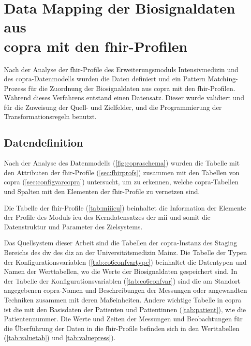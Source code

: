 \section[Data Mapping der Biosignaldaten aus \acs{copra} mit den \acs{fhir}-Profilen]{Data Mapping der Biosignaldaten aus \\ \acs{copra} mit den \acs{fhir}-Profilen} \label{sec:datamappingicucopra}

Nach der Analyse der \ac{fhir}-Profile des Erweiterungsmoduls \glqq Intensivmedizin\grqq{} und des \ac{copra}-Datenmodells wurden die Daten definiert und ein Pattern Matching-Prozess für die Zuordnung der Biosignaldaten aus \ac{copra} mit den \ac{fhir}-Profilen. Während dieses Verfahrens entstand einen Datensatz. Dieser wurde validiert und für die Zuweisung der Quell- und Zielfelder, und die Programmierung der Transformationsregeln benutzt.

\subsection{Datendefinition} \label{subsec:datadef}

Nach der Analyse des Datenmodells (\ref{fig:copraschema}) wurden die Tabelle mit den Attributen der \ac{fhir}-Profile (\ref{sec:fhirprofs}) zusammen mit den Tabellen von \ac{copra} (\ref{sec:configvarcopra}) untersucht, um zu erkennen, welche \ac{copra}-Tabellen und Spalten mit den Elementen der \ac{fhir}-Profile zu vernetzen sind.

Die Tabelle der \ac{fhir}-Profile (\ref{tab:miiicu}) beinhaltet die Information der Elemente der Profile des Moduls \glqq\ac{icu}\grqq{} des Kerndatensatzes der \ac{mii} und somit die Datenstruktur und Parameter des Zielsystems.

Das Quellsystem dieser Arbeit sind die Tabellen der \ac{copra}-Instanz des Staging Bereichs des \ac{dw} des \ac{diz} an der Universitätsmedizin Mainz. Die Tabelle der Typen der Konfigurationsvariablen (\ref{tab:co6confvartype}) beinhaltet die Datentypen und Namen der Werttabellen, wo die Werte der Biosignaldaten gespeichert sind. In der Tabelle der Konfigurationsvariablen (\ref{tab:co6confvar}) sind die am Standort angegebenen \ac{copra}-Namen und Beschreibungen der Messungen oder angewandten Techniken zusammen mit deren Maßeinheiten. Andere wichtige Tabelle in \ac{copra} ist die mit den Basisdaten der Patienten und Patientinnen (\ref{tab:patient}), wie die Patientennummer. Die Werte und Zeiten der Messungen und Beobachtungen für die Überführung der Daten in die \ac{fhir}-Profile befinden sich in den Werttabellen (\ref{tab:valuetab}) und \ref{tab:valuepress}).

